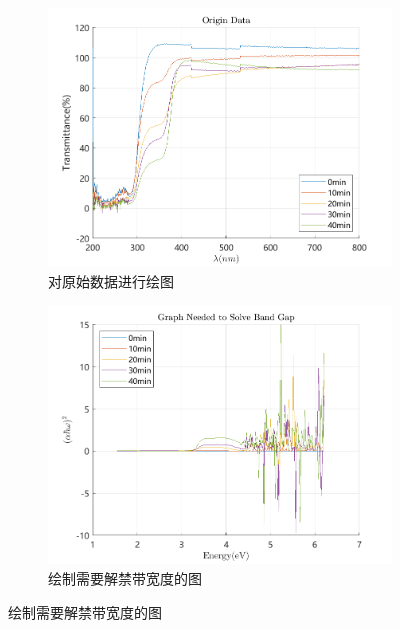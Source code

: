 \documentclass{ctexart}
\begin{document}
\begin{figure}[H]
  \centering
  \begin{subfigure}{.49\textwidth}
    \centering
    \includegraphics[width=\linewidth]{禁带宽度数据处理程序/figures/original_data/original_data}
    \caption{对原始数据进行绘图}
  \end{subfigure}
  \begin{subfigure}{.49\textwidth}
    \centering
    \includegraphics[width=\linewidth]{禁带宽度数据处理程序/figures/graph_needed_to_solve_band_gap/graph_needed_to_solve_band_gap}
    \caption{绘制需要解禁带宽度的图}
  \end{subfigure}
\end{figure}
\end{document}

